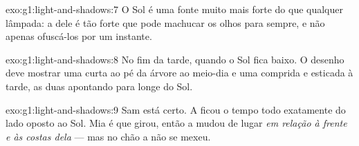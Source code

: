 \begin{solution}{exo:g1:light-and-shadows:7}
O Sol é uma fonte muito mais forte do que qualquer lâmpada: a 
dele é tão forte que pode machucar os olhos para sempre, e não apenas
ofuscá-los por um instante.
\end{solution}

\begin{solution}{exo:g1:light-and-shadows:8}
No fim da tarde, quando o Sol fica baixo. O desenho deve mostrar uma
 curta ao pé da árvore ao meio-dia e uma  comprida e
esticada à tarde, as duas apontando para longe do Sol.
\end{solution}

\begin{solution}{exo:g1:light-and-shadows:9}
Sam está certo. A  ficou o tempo todo exatamente do lado oposto
ao Sol. Mia é que girou, então a  mudou de lugar \emph{em
relação à frente e às costas dela} --- mas no chão a  não se
mexeu.
\end{solution}
